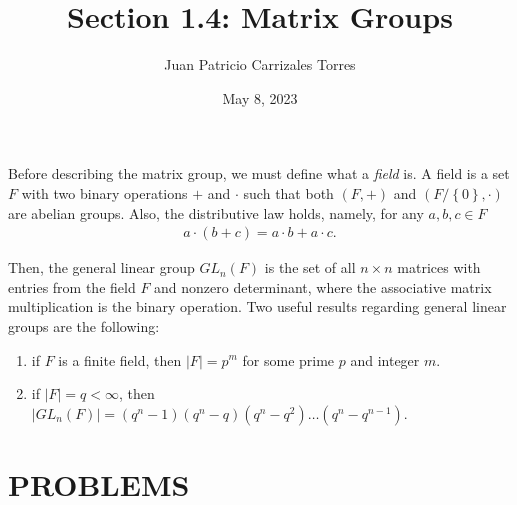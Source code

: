 \documentclass[12pt]{article}
\begin{document}
  
 \title{Section 1.4: Matrix Groups}
   \author{Juan Patricio Carrizales Torres}
     \date{May 8, 2023}
       \maketitle

       Before describing the matrix group, we must define what a \textit{field} is. A field is a set $F$ with two binary operations $+$ and $\cdot$ such that both $(F,+)$ and $(F/\left\{ 0 \right\},\cdot)$ are abelian groups. Also, the distributive law holds, namely, for any $a,b,c\in F$
\begin{align*}
  a\cdot(b+c) = a\cdot b + a\cdot c.
\end{align*}

Then, the general linear group $GL_{n}(F)$ is the set of all $n\times n$ matrices with entries from the field $F$ and nonzero determinant, where the associative matrix multiplication is the binary operation. Two useful results regarding general linear groups are the following: 
\begin{enumerate}
  \item if $F$ is a finite field, then $|F|=p^{m}$ for some prime $p$ and integer $m$.
  \item if $|F|=q<\infty$, then $|GL_{n}(F)|=(q^{n}-1)(q^{n}-q)(q^{n}-q^{2})\dots(q^{n}-q^{n-1})$.
\end{enumerate}
	
\section{PROBLEMS}
\end{document}
